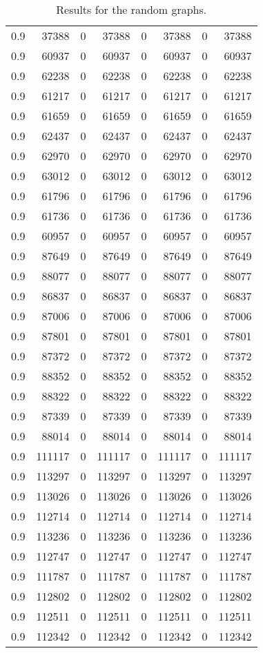 \documentclass{scrartcl}
\theoremstyle{plain}
\begin{document}
\begin{table}[!ht]
\begin{tabular}{|l|rr|rr|rr|r|}
0.9 & 37388 & 0 & 37388 & 0 & 37388 & 0 & 37388 \\ 
0.9 & 60937 & 0 & 60937 & 0 & 60937 & 0 & 60937 \\ 
0.9 & 62238 & 0 & 62238 & 0 & 62238 & 0 & 62238 \\ 
0.9 & 61217 & 0 & 61217 & 0 & 61217 & 0 & 61217 \\ 
0.9 & 61659 & 0 & 61659 & 0 & 61659 & 0 & 61659 \\ 
0.9 & 62437 & 0 & 62437 & 0 & 62437 & 0 & 62437 \\ 
0.9 & 62970 & 0 & 62970 & 0 & 62970 & 0 & 62970 \\ 
0.9 & 63012 & 0 & 63012 & 0 & 63012 & 0 & 63012 \\ 
0.9 & 61796 & 0 & 61796 & 0 & 61796 & 0 & 61796 \\ 
0.9 & 61736 & 0 & 61736 & 0 & 61736 & 0 & 61736 \\ 
0.9 & 60957 & 0 & 60957 & 0 & 60957 & 0 & 60957 \\ 
0.9 & 87649 & 0 & 87649 & 0 & 87649 & 0 & 87649 \\ 
0.9 & 88077 & 0 & 88077 & 0 & 88077 & 0 & 88077 \\ 
0.9 & 86837 & 0 & 86837 & 0 & 86837 & 0 & 86837 \\ 
0.9 & 87006 & 0 & 87006 & 0 & 87006 & 0 & 87006 \\ 
0.9 & 87801 & 0 & 87801 & 0 & 87801 & 0 & 87801 \\ 
0.9 & 87372 & 0 & 87372 & 0 & 87372 & 0 & 87372 \\ 
0.9 & 88352 & 0 & 88352 & 0 & 88352 & 0 & 88352 \\ 
0.9 & 88322 & 0 & 88322 & 0 & 88322 & 0 & 88322 \\ 
0.9 & 87339 & 0 & 87339 & 0 & 87339 & 0 & 87339 \\ 
0.9 & 88014 & 0 & 88014 & 0 & 88014 & 0 & 88014 \\ 
0.9 & 111117 & 0 & 111117 & 0 & 111117 & 0 & 111117 \\ 
0.9 & 113297 & 0 & 113297 & 0 & 113297 & 0 & 113297 \\ 
0.9 & 113026 & 0 & 113026 & 0 & 113026 & 0 & 113026 \\ 
0.9 & 112714 & 0 & 112714 & 0 & 112714 & 0 & 112714 \\ 
0.9 & 113236 & 0 & 113236 & 0 & 113236 & 0 & 113236 \\ 
0.9 & 112747 & 0 & 112747 & 0 & 112747 & 0 & 112747 \\ 
0.9 & 111787 & 0 & 111787 & 0 & 111787 & 0 & 111787 \\ 
0.9 & 112802 & 0 & 112802 & 0 & 112802 & 0 & 112802 \\ 
0.9 & 112511 & 0 & 112511 & 0 & 112511 & 0 & 112511 \\ 
0.9 & 112342 & 0 & 112342 & 0 & 112342 & 0 & 112342 \\ 
 

\hline
\end{tabular}

	\caption{\label{tab:random_sto}Results for the random graphs.}
\end{table}
\end{document}
